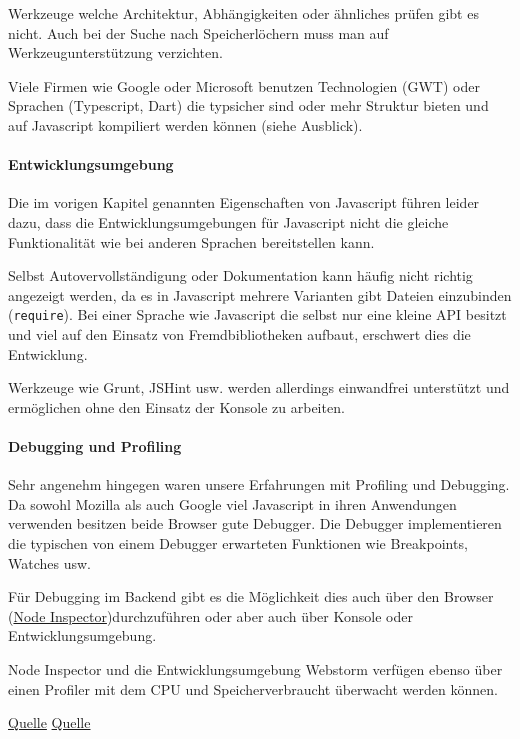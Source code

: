 \documentclass[]{article}
\begin{document}
Werkzeuge welche Architektur, Abhängigkeiten oder ähnliches prüfen gibt
es nicht. Auch bei der Suche nach Speicherlöchern muss man auf
Werkzeugunterstützung verzichten.

Viele Firmen wie Google oder Microsoft benutzen Technologien (GWT) oder
Sprachen (Typescript, Dart) die typsicher sind oder mehr Struktur bieten
und auf Javascript kompiliert werden können (siehe Ausblick).

\paragraph{Entwicklungsumgebung}\label{entwicklungsumgebung}

Die im vorigen Kapitel genannten Eigenschaften von Javascript führen
leider dazu, dass die Entwicklungsumgebungen für Javascript nicht die
gleiche Funktionalität wie bei anderen Sprachen bereitstellen kann.

Selbst Autovervollständigung oder Dokumentation kann häufig nicht
richtig angezeigt werden, da es in Javascript mehrere Varianten gibt
Dateien einzubinden (\texttt{require}). Bei einer Sprache wie Javascript
die selbst nur eine kleine API besitzt und viel auf den Einsatz von
Fremdbibliotheken aufbaut, erschwert dies die Entwicklung.

Werkzeuge wie Grunt, JSHint usw. werden allerdings einwandfrei
unterstützt und ermöglichen ohne den Einsatz der Konsole zu arbeiten.

\paragraph{Debugging und Profiling}\label{debugging-und-profiling}

Sehr angenehm hingegen waren unsere Erfahrungen mit Profiling und
Debugging. Da sowohl Mozilla als auch Google viel Javascript in ihren
Anwendungen verwenden besitzen beide Browser gute Debugger. Die Debugger
implementieren die typischen von einem Debugger erwarteten Funktionen
wie Breakpoints, Watches usw.

Für Debugging im Backend gibt es die Möglichkeit dies auch über den
Browser (\href{https://github.com/node-inspector/node-inspector}{Node
Inspector})durchzuführen oder aber auch über Konsole oder
Entwicklungsumgebung.

Node Inspector und die Entwicklungsumgebung Webstorm verfügen ebenso
über einen Profiler mit dem CPU und Speicherverbraucht überwacht werden
können.

\href{https://developer.chrome.com/devtools/docs/javascript-memory-profiling}{Quelle}
\href{https://developer.chrome.com/devtools/docs/cpu-profiling}{Quelle}
\end{document}
